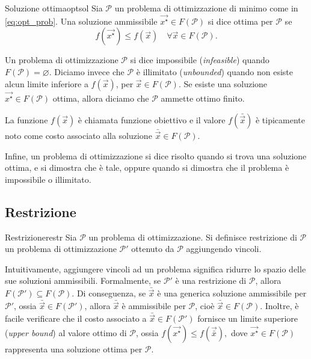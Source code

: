 \begin{definition}{Soluzione ottima}{optsol}
    Sia \( \mathcal{P} \) un problema di ottimizzazione di minimo come in \eqref{eq:opt_prob}. Una soluzione
    ammissibile \( \vec{x^{\star}} \in F(\mathcal{P}) \) si dice ottima per \( \mathcal{P} \) se
    \[
        f(\vec{x^{\star}}) \leq f(\vec{x}) \quad \forall \vec{x} \in F(\mathcal{P}).
    \]
\end{definition}
Un problema di ottimizzazione \( \mathcal{P} \) si dice impossibile (\textit{infeasible}) quando
\(
    F(\mathcal{P}) = \varnothing.
\)
Diciamo invece che
\(
    \mathcal{P}
\)
è illimitato (\textit{unbounded}) quando non esiste alcun limite inferiore a \( f(\vec{x}) \), per \( \vec{x} \in
F(\mathcal{P}) \). Se esiste una soluzione \( \vec{x^{\star}} \in F(\mathcal{P}) \) ottima, allora
diciamo che \( \mathcal{P} \) ammette ottimo finito.

La funzione \( f(\vec{x}) \) è chiamata funzione obiettivo e il valore \( f(\bar{\vec{x}}) \) è tipicamente noto come
costo associato alla soluzione \( \bar{\vec{x}} \in F(\mathcal{P}) \).

Infine, un problema di ottimizzazione si dice risolto quando si trova una soluzione ottima, e si dimostra che è tale,
oppure quando si dimostra che il problema è impossibile o illimitato.

\subsection{Restrizione}
\begin{definition}{Restrizione}{restr}
    Sia \( \mathcal{P} \) un problema di ottimizzazione. Si definisce restrizione di \( \mathcal{P} \) un problema di
    ottimizzazione \( \mathcal{P}' \) ottenuto da \( \mathcal{P} \) aggiungendo vincoli.
\end{definition}
\noindent
Intuitivamente, aggiungere vincoli ad un problema significa ridurre lo spazio delle sue soluzioni ammissibili.
Formalmente, se \( \mathcal{P}' \) è una restrizione di \( \mathcal{P} \), allora \( F(\mathcal{P}') \subseteq
F(\mathcal{P}) \). Di conseguenza, se \( \bar{\vec{x}} \) è una generica soluzione ammissibile per \( \mathcal{P}' \),
ossia \( \bar{\vec{x}} \in F(\mathcal{P}')\), allora \( \bar{\vec{x}} \) è ammissibile per \( \mathcal{P} \), cioè \(
\bar{\vec{x}} \in F(\mathcal{P}) \). Inoltre, è facile verificare che il costo associato a \( \bar{\vec{x}} \in
F(\mathcal{P}') \) fornisce
un limite superiore (\textit{upper bound}) al valore ottimo di \( \mathcal{P} \), ossia
\(
    f(\vec{x^{\star}}) \leq f(\vec{\bar{x}}),
\)
dove \( \vec{x^{\star}} \in F(\mathcal{P}) \) rappresenta una soluzione ottima per \( \mathcal{P} \).

